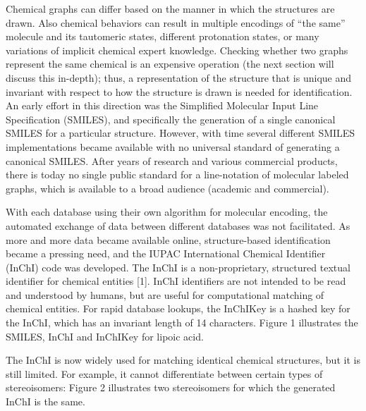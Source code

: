\documentclass{sig-alternate}
\begin{document}
Chemical graphs can differ based on the manner in which the structures
are drawn. Also chemical behaviors can result in multiple encodings of
``the same'' molecule and its tautomeric states, different protonation
states, or many variations of implicit chemical expert
knowledge. Checking whether two graphs represent the same chemical is
an expensive operation (the next section will discuss this in-depth);
thus, a representation of the structure that is unique and invariant
with respect to how the structure is drawn is needed for
identification. An early effort in this direction was the Simplified
Molecular Input Line Specification (SMILES), and specifically the
generation of a single canonical SMILES for a particular structure. However,
with time several
different SMILES implementations became available with no universal
standard of generating a canonical SMILES. After years of research and various
commercial products, there is today no single public standard for a
line-notation of molecular labeled graphs, which is available to a
broad audience (academic and
commercial). %

With each database using their own algorithm for molecular encoding,
the automated exchange of data between different databases was not
facilitated. As more and more data became available online,
structure-based identification became a pressing need, and the IUPAC
International Chemical Identifier (InChI) code was developed. The
InChI is a non-proprietary, structured textual identifier for chemical
entities [1]. InChI identifiers are not intended to be read and
understood by humans, but are useful for computational matching of
chemical entities. For rapid database lookups, the InChIKey is a
hashed key for the InChI, which has an invariant length of 14
characters. Figure 1 illustrates the SMILES, InChI and InChIKey for
lipoic acid.


The InChI is now widely used for matching identical chemical structures, but it
is still limited. For example, it cannot differentiate between
certain types of stereoisomers: Figure 2 illustrates two stereoisomers for which
the generated InChI is the same.
\end{document}

